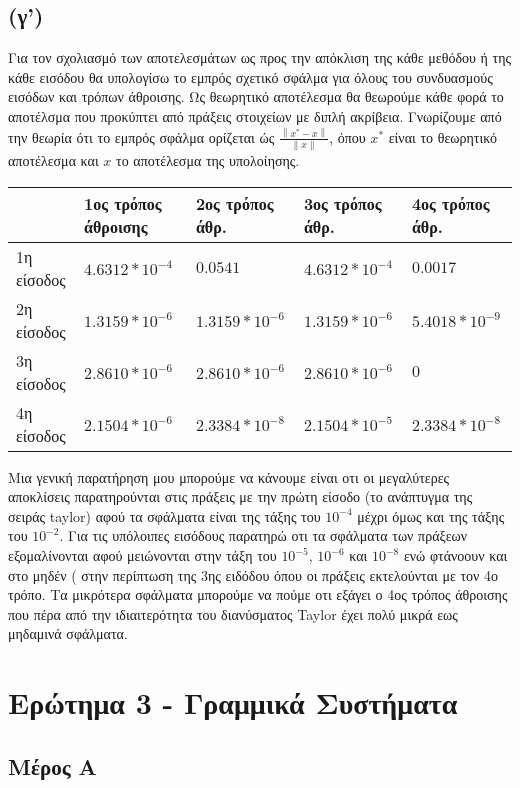 \documentclass{article}
\begin{document}
\subsection*{(γ')}
Για τον σχολιασμό των αποτελεσμάτων ως προς την απόκλιση της κάθε μεθόδου ή της κάθε εισόδου θα υπολογίσω το εμπρός σχετικό σφάλμα για όλους του συνδυασμούς εισόδων και τρόπων άθροισης. Ως θεωρητικό αποτέλεσμα θα θεωρούμε κάθε φορά το αποτέλσμα που προκύπτει από πράξεις στοιχείων με διπλή ακρίβεια.
Γνωρίζουμε από την θεωρία ότι το εμπρός σφάλμα ορίζεται ώς $\frac{\left \| x^\ast - x \right \|}{\left \| x \right \|}$, όπου $x^\ast$ είναι το θεωρητικό αποτέλεσμα και $x$ το αποτέλεσμα της υπολοίησης.
\begin{center}
 \begin{tabular}{ | l | l | l | l | l |}
    \hline
     & 1ος τρόπος άθροισης & 2ος τρόπος άθρ. & 3ος τρόπος άθρ. & 4ος τρόπος άθρ.\\\hline
1η είσοδος & $4.6312*10^{-4}$ & $0.0541$ & $4.6312*10^{-4}$ & $0.0017$\\\hline
2η είσοδος & $1.3159*10^{-6}$ & $1.3159*10^{-6}$ & $1.3159*10^{-6}$ & $5.4018*10^{-9}$\\\hline
3η είσοδος & $2.8610*10^{-6}$ & $2.8610*10^{-6}$ & $2.8610*10^{-6}$ & $0$\\\hline
4η είσοδος & $2.1504*10^{-6}$ & $2.3384*10^{-8}$ & $2.1504*10^{-5}$ & $2.3384*10^{-8}$\\\hline
\end{tabular}
\end{center}
Μια γενική παρατήρηση μου μπορούμε να κάνουμε είναι οτι οι μεγαλύτερες αποκλίσεις παρατηρούνται στις πράξεις με την πρώτη είσοδο (το ανάπτυγμα της σειράς  taylor) αφού τα σφάλματα είναι της τάξης του $10^{-4}$ μέχρι όμως και της τάξης του $10^{-2}$. Για τις υπόλοιπες εισόδους παρατηρώ οτι τα σφάλματα των πράξεων εξομαλίνονται αφού μειώνονται στην τάξη του $10^{-5}$, $10^{-6}$ και $10^{-8}$ ενώ φτάνοουν και στο μηδέν ( στην περίπτωση της 3ης ειδόδου όπου οι πράξεις εκτελούνται με τον 4ο τρόπο. Τα μικρότερα σφάλματα μπορούμε να πούμε οτι εξάγει ο 4ος τρόπος άθροισης που πέρα από την ιδιαιτερότητα του διανύσματος Taylor έχει πολύ μικρά εως μηδαμινά σφάλματα.
\section*{Ερώτημα 3 - Γραμμικά Συστήματα}
\subsection*{Μέρος Α}
\end{document}
